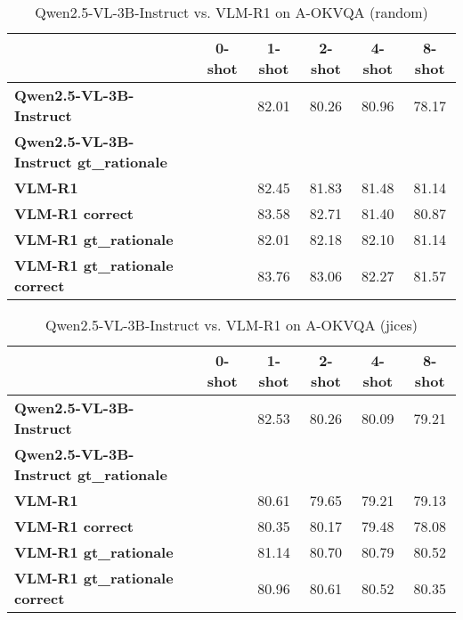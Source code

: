 \begin{table}
\caption{Qwen2.5-VL-3B-Instruct vs. VLM-R1 on A-OKVQA (random)}
\label{tab:Qwen2.5-VL-3B-Instruct_A-OKVQA_TRAIN_random}
\begin{tabular}{lccccc}
\toprule
 & 0-shot & 1-shot & 2-shot & 4-shot & 8-shot \\
\midrule
\textbf{Qwen2.5-VL-3B-Instruct} &  & 82.01 & 80.26 & 80.96 & 78.17 \\
\textbf{Qwen2.5-VL-3B-Instruct gt\_rationale} &  &  &  &  &  \\
\textbf{VLM-R1} &  & 82.45 & 81.83 & 81.48 & 81.14 \\
\textbf{VLM-R1 correct} &  & 83.58 & 82.71 & 81.40 & 80.87 \\
\textbf{VLM-R1 gt\_rationale} &  & 82.01 & 82.18 & 82.10 & 81.14 \\
\textbf{VLM-R1 gt\_rationale correct} &  & 83.76 & 83.06 & 82.27 & 81.57 \\
\bottomrule
\end{tabular}
\end{table}


\begin{table}
\caption{Qwen2.5-VL-3B-Instruct vs. VLM-R1 on A-OKVQA (jices)}
\label{tab:Qwen2.5-VL-3B-Instruct_A-OKVQA_TRAIN_jices}
\begin{tabular}{lccccc}
\toprule
 & 0-shot & 1-shot & 2-shot & 4-shot & 8-shot \\
\midrule
\textbf{Qwen2.5-VL-3B-Instruct} &  & 82.53 & 80.26 & 80.09 & 79.21 \\
\textbf{Qwen2.5-VL-3B-Instruct gt\_rationale} &  &  &  &  &  \\
\textbf{VLM-R1} &  & 80.61 & 79.65 & 79.21 & 79.13 \\
\textbf{VLM-R1 correct} &  & 80.35 & 80.17 & 79.48 & 78.08 \\
\textbf{VLM-R1 gt\_rationale} &  & 81.14 & 80.70 & 80.79 & 80.52 \\
\textbf{VLM-R1 gt\_rationale correct} &  & 80.96 & 80.61 & 80.52 & 80.35 \\
\bottomrule
\end{tabular}
\end{table}


